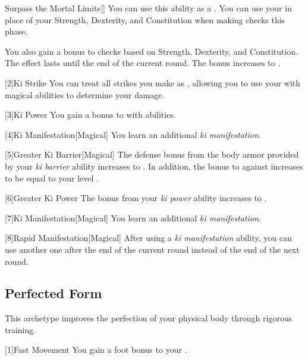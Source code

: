 {            \begin{freeability}{Surpass the Mortal Limits}[]
                You can use this ability as a .
                You can use your  in place of your Strength, Dexterity, and Constitution when making checks this phase.

                \rankline
                 You also gain a  bonus to checks based on Strength, Dexterity, and Constitution.
                 The effect lasts until the end of the current round.
                 The bonus increases to .
            \end{freeability}

        }

        [2]{Ki Strike} You can treat all strikes you make as , allowing you to use your  with magical abilities to determine your damage.

        [3]{Ki Power} You gain a  bonus to  with  abilities.

        [4]{Ki Manifestation}[Magical]
        You learn an additional \textit{ki manifestation}.

        [5]{Greater Ki Barrier}[Magical] The defense bonus from the body armor provided by your \textit{ki barrier} ability increases to .
        In addition, the bonus to  against  increases to be equal to your level .

        [6]{Greater Ki Power} The bonus from your \textit{ki power} ability increases to .

        [7]{Ki Manifestation}[Magical]
        You learn an additional \textit{ki manifestation}.

        [8]{Rapid Manifestation}[Magical] After using a \textit{ki manifestation} ability, you can use another one after the end of the current round instead of the end of the next round. 

    \subsection{Perfected Form}
        This archetype improves the perfection of your physical body through rigorous training.

        [1]{Fast Movement} You gain a  foot bonus to your .

